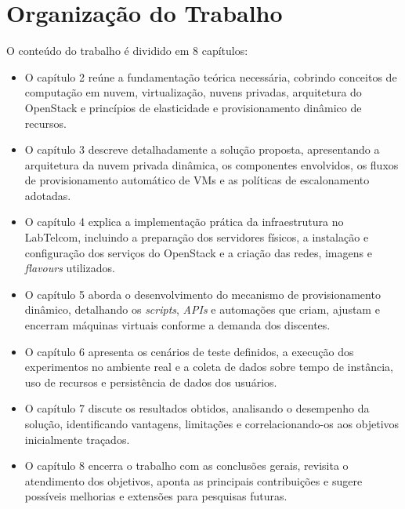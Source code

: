 \section{Organização do Trabalho}
O conteúdo do trabalho é dividido em 8 capítulos:
\begin{itemize}
    \item O capítulo 2 reúne a fundamentação teórica necessária, cobrindo conceitos de computação em nuvem, virtualização, nuvens privadas, arquitetura do OpenStack e princípios de elasticidade e provisionamento dinâmico de recursos.
    
    \item O capítulo 3 descreve detalhadamente a solução proposta, apresentando a arquitetura da nuvem privada dinâmica, os componentes envolvidos, os fluxos de provisionamento automático de VMs e as políticas de escalonamento adotadas.
    
    \item O capítulo 4 explica a implementação prática da infraestrutura no LabTelcom, incluindo a preparação dos servidores físicos, a instalação e configuração dos serviços do OpenStack e a criação das redes, imagens e \textit{flavours} utilizados.
    
    \item O capítulo 5 aborda o desenvolvimento do mecanismo de provisionamento dinâmico, detalhando os \textit{scripts}, \textit{APIs} e automações que criam, ajustam e encerram máquinas virtuais conforme a demanda dos discentes.
    
    \item O capítulo 6 apresenta os cenários de teste definidos, a execução dos experimentos no ambiente real e a coleta de dados sobre tempo de instância, uso de recursos e persistência de dados dos usuários.
    
    \item O capítulo 7 discute os resultados obtidos, analisando o desempenho da solução, identificando vantagens, limitações e correlacionando-os aos objetivos inicialmente traçados.
    
    \item O capítulo 8 encerra o trabalho com as conclusões gerais, revisita o atendimento dos objetivos, aponta as principais contribuições e sugere possíveis melhorias e extensões para pesquisas futuras.
\end{itemize}
